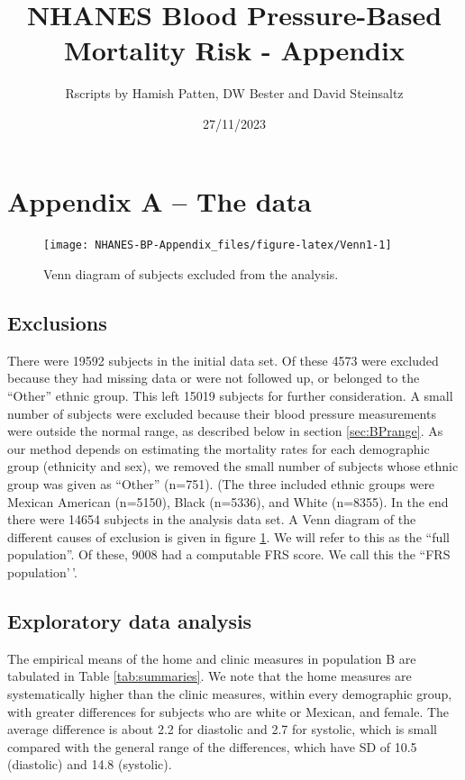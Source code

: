 \documentclass[
]{article}
\title{NHANES Blood Pressure-Based Mortality Risk - Appendix}
\author{Rscripts by Hamish Patten, DW Bester and David Steinsaltz}
\date{27/11/2023}
\begin{document}
\maketitle

{
\setcounter{tocdepth}{3}
\tableofcontents
}
\hypertarget{appendix-a-the-data}{%
\section{Appendix A -- The data}\label{appendix-a-the-data}}

\begin{figure}

{\centering \texttt{[image: NHANES-BP-Appendix\_files/figure-latex/Venn1-1]} 

}

\caption{Venn diagram of subjects excluded from the analysis.}\label{fig:Venn1}
\end{figure}

\hypertarget{exclusions}{%
\subsection{Exclusions}\label{exclusions}}

There were 19592 subjects in the initial data set.
Of these 4573 were excluded because they had missing data or were not followed up, or belonged to the ``Other'' ethnic group.
This left 15019 subjects for further consideration.
A small number of subjects were excluded because their blood pressure measurements were outside the normal range, as described below in section \ref{sec:BPrange}.
As our method depends on estimating the mortality rates for each demographic group (ethnicity and sex),
we removed the small number of subjects whose ethnic group was given as ``Other'' (n=751).
(The three included ethnic groups were Mexican American (n=5150), Black (n=5336), and White (n=8355).
In the end there were 14654 subjects in the analysis data set.
A Venn diagram of the different causes of exclusion is given in figure \ref{fig:Venn1}.
We will refer to this as the ``full population''.
Of these, 9008 had a computable FRS score.
We call this the ``FRS population'\,'.

\hypertarget{exploratory-data-analysis}{%
\subsection{Exploratory data analysis}\label{exploratory-data-analysis}}

The empirical means of the home and clinic measures in population B are tabulated in Table \ref{tab:summaries}. We note that the home measures are systematically higher than the clinic measures, within every demographic group, with greater differences for subjects who are white or Mexican, and female.
The average difference is about 2.2 for diastolic and 2.7 for systolic, which is small compared with the general range of the differences, which have SD of
10.5 (diastolic) and 14.8 (systolic).
\end{document}

